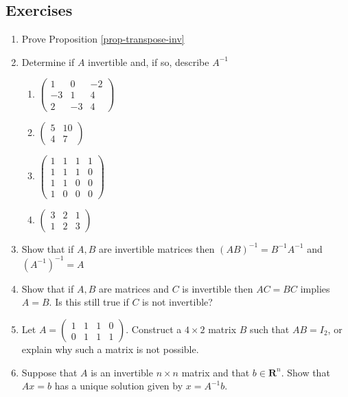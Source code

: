 \documentclass[12pt]{article}
\numberwithin{equation}{subsection}
\numberwithin{figure}{subsection}
\theoremstyle{note}
\begin{document}
\subsection{Exercises}
\begin{enumerate}[label=\arabic*.]

\item Prove Proposition \ref{prop-transpose-inv}

\item Determine if $A$ invertible and, if so, describe $A^{-1}$
\begin{enumerate}
	\item $\begin{pmatrix} 1 & 0 & -2 \\ -3 & 1 & 4 \\ 2 & -3 & 4 \end{pmatrix}$\
	\item $\begin{pmatrix} 5 & 10 \\ 4 & 7  \end{pmatrix}$
	\item $\begin{pmatrix} 1 & 1 & 1 & 1 \\ 1 & 1 & 1 & 0 \\ 1 & 1 & 0 & 0 \\ 1 & 0 & 0 & 0  \end{pmatrix}$
	\item $\begin{pmatrix} 3 & 2 & 1 \\ 1 & 2 & 3\end{pmatrix}$
\end{enumerate}

\item Show that if $A,B$ are invertible matrices then $(AB)^{-1}=B^{-1}A^{-1}$ and $(A^{-1})^{-1}=A$

\item Show that if $A,B$ are matrices and $C$ is invertible then $AC=BC$ implies $A=B$. Is this still true if $C$ is not invertible?

\item Let $A=\begin{pmatrix} 1 & 1 & 1 & 0 \\ 0 & 1 & 1 & 1 \end{pmatrix}$. Construct a $4\times 2$ matrix $B$ such that $AB=I_2$, or explain why such a matrix is not possible. 
\item Suppose that $A$ is an invertible $n\times n$ matrix and that $b\in\mathbf{R}^n$. Show that $Ax=b$ has a unique solution given by $x=A^{-1}b$. 


\end{enumerate}
\end{document}
